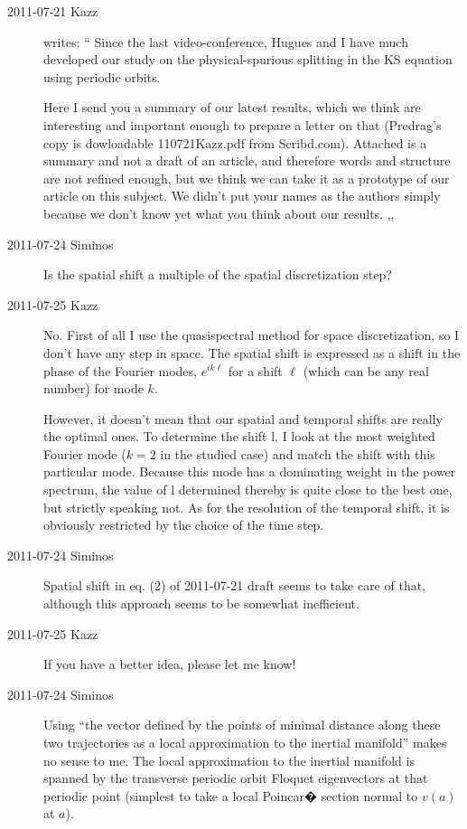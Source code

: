 \begin{description}

\item[2011-07-21 Kazz] writes:
``
Since the last video-conference, Hugues and I have much developed our
study on the physical-spurious splitting in the KS equation using
periodic orbits.

Here I send you a summary of our latest results, which we think are
interesting and important enough to prepare a letter on that (Predrag's
copy is dowloadable
{110721Kazz.pdf} from Scribd.com). Attached is a summary and not a draft of
an article, and therefore words and structure are not refined enough, but
we think we can take it as a prototype of our article on this subject. We
didn't put your names as the authors simply because we don't know yet
what you think about our results.
,,

\item[2011-07-24 Siminos]
Is the spatial shift a multiple of the spatial discretization step?

\item[2011-07-25 Kazz]
No. First of all I use the quasispectral method for space discretization,
so I don't have any step in space. The spatial shift is expressed as a
shift in the phase of the Fourier modes, $e^{ik\ell}$ for a shift ${\ell}$ (which
can be any real number) for mode $k$.

However, it doesn't mean that our spatial and temporal shifts are really
the optimal ones. To determine the shift l, I look at the most weighted
Fourier mode ($k=2$ in the studied case) and match the shift with this
particular mode. Because this mode has a dominating weight in the power
spectrum, the value of l determined thereby is quite close to the best
one, but strictly speaking not. As for the resolution of the temporal
shift, it is obviously restricted by the choice of the time step.

\item[2011-07-24 Siminos]
Spatial shift in eq. (2) of 2011-07-21 draft seems to take care
of that, although this approach seems to be somewhat inefficient.

\item[2011-07-25 Kazz]
If you have a better idea, please let me know!

\item[2011-07-24 Siminos]
    Using ``the vector defined by the points of minimal distance along
    these two trajectories as a local approximation to the inertial
    manifold'' makes no sense to me. The local approximation to the
    inertial manifold is spanned by the transverse periodic orbit Floquet
    eigenvectors at that periodic point (simplest to take a local
    Poincar� section normal to $v(a)$ at $a$).


\end{description}
